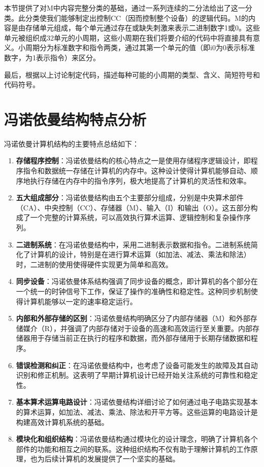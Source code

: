 \documentclass[12pt]{article} %
\theoremstyle{definition}
\begin{document}
本节提供了对M中内容完整分类的基础，通过一系列连续的二分法给出了这一分类。此分类使我们能够制定出控制CC（因而控制整个设备）的逻辑代码。M的内容是由存储单元组成，每个单元通过存在或缺失刺激来表示二进制数字1或0。这些单元被组织成32单元的小周期，这些小周期在我们将要介绍的代码中将直接具有意义。小周期分为标准数字和指令两类，通过其第一个单元的值（即i0为0表示标准数字，为1表示指令）来区分。

最后，根据以上讨论制定代码，描述每种可能的小周期的类型、含义、简短符号和代码符号。

\section{冯诺依曼结构特点分析}

冯诺依曼计算机结构的主要特点总结如下\cite{vonNeumann1945edvac}：

\begin{enumerate}
  \item \textbf{存储程序控制}：冯诺依曼结构的核心特点之一是使用存储程序逻辑设计，即程序指令和数据统一存储在计算机的内存中。这种设计使得计算机能够自动、顺序地执行存储在内存中的指令序列，极大地提高了计算机的灵活性和效率。
  \item \textbf{五大组成部分}：冯诺依曼结构由五个主要部分组成，分别是中央算术部件（CA）、中央控制（CC）、存储器（M）、输入（I）和输出（O）。这五部分构成了一个完整的计算系统，可以高效执行算术运算、逻辑控制和复杂操作序列。
  \item \textbf{二进制系统}：在冯诺依曼结构中，采用二进制表示数据和指令。二进制系统简化了计算机的设计，特别是在进行算术运算（如加法、减法、乘法和除法）时，二进制的使用使得硬件实现更为简单和高效。
  \item \textbf{同步设备}：冯诺依曼体系结构强调了同步设备的概念，即计算机的各个部分在一个统一的时钟信号下工作，保证了操作的准确性和稳定性。这种同步机制使得计算机能够以一定的速率稳定运行。
  \item \textbf{内部和外部存储的区别}：冯诺依曼结构明确区分了内部存储器（M）和外部存储媒介（R），并强调了内部存储对于设备的高速和高效运行至关重要。内部存储器用于存储当前正在执行的程序和数据，而外部存储用于长期存储数据和程序。
  \item \textbf{错误检测和纠正}：在冯诺依曼结构中，也考虑了设备可能发生的故障及其自动识别和修正机制。这表明了早期计算机设计已经开始关注系统的可靠性和稳定性。
  \item \textbf{基本算术运算电路设计}：冯诺依曼结构详细讨论了如何通过电子电路实现基本的算术运算，如加法、减法、乘法、除法和开平方等。这些运算的电路设计是构建高效计算机系统的基础。
  \item \textbf{模块化和组织结构}：冯诺依曼结构通过模块化的设计理念，明确了计算机各个部件的功能和相互之间的联系。这种组织结构不仅有助于理解计算机的工作原理，也为后续计算机的发展提供了一个坚实的基础。
\end{enumerate}
\end{document}

